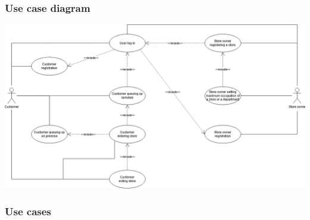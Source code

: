 \subsubsection{Use case diagram}
\includegraphics[scale=0.4]{Images/Use Case Diagram.png}
\subsubsection{Use cases}
